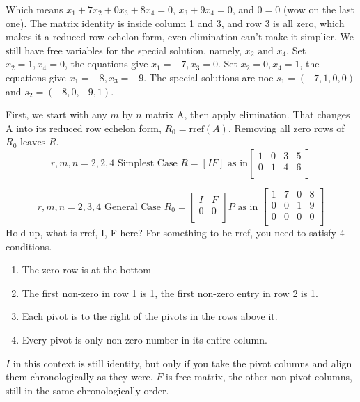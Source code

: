 Which means \(x_1 + 7x_2 + 0x_3 + 8x_4 = 0\), \(x_3 + 9x_4 = 0\), and \(0 = 0\) (wow on the last one). The matrix identity is inside column 1 and 3, and row 3 is all zero, which makes it a reduced row echelon form, even elimination can't make it simplier. We still have free variables for the special solution, namely, \(x_2 \text{ and } x_4\).   
Set \(x_2 = 1, x_4 = 0\), the equations give \(x_1 = -7, x_3 = 0\).
Set \(x_2 = 0, x_4 = 1\), the equations give \(x_1 = -8, x_3 = -9\).
The special solutions are noe \(s_1 = (-7, 1, 0, 0)\) and \(s_2 = (-8 ,0 , -9, 1)\).

First, we start with any \(m \text{ by } n\) matrix A, then apply elimination. That changes A into its reduced row echelon form, \(R_0 = \text{rref} (A)\). Removing all zero rows of \(R_0 \text{ leaves } R\).
\[
    r, m, n = 2, 2, 4 \text{ Simplest Case } R = [I F]
    \text{ as in}
    \begin{bmatrix}
        1 & 0 & 3 & 5  \\
        0 & 1 & 4 & 6  \\
    \end{bmatrix}
\]    

\[
    r, m, n = 2, 3, 4 \text{ General Case } 
    R_0 =
    \begin{bmatrix}
        I & F  \\
        0 & 0  \\
    \end{bmatrix}
    P
    \text{ as in }
    \begin{bmatrix}
        1 & 7 & 0 & 8  \\
        0 & 0 & 1 & 9  \\
        0 & 0 & 0 & 0  \\
    \end{bmatrix}
\] 
Hold up, what is rref, I, F here?
For something to be rref, you need to satisfy 4 conditions.
\begin{enumerate}
    \item The zero row is at the bottom
    \item The first non-zero in row 1 is 1, the first non-zero entry in row 2 is 1. 
    \item Each pivot is to the right of the pivots in the rows above it.
    \item Every pivot is only non-zero number in its entire column.
\end{enumerate}

\(I\) in this context is still identity, but only if you take the pivot columns and align them chronologically as they were.
\(F\) is free matrix, the other non-pivot columns, still in the same chronologically order.

